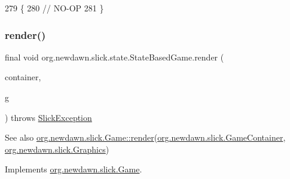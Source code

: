 \begin{DoxyCode}
279                                                                                             \{
280         \textcolor{comment}{// NO-OP}
281     \}
\end{DoxyCode}
\mbox{\label{classorg_1_1newdawn_1_1slick_1_1state_1_1_state_based_game_ae7832a5a852c1343e0abebf031bdc12a}} 
\subsubsection{\texorpdfstring{render()}{render()}}
{\footnotesize\ttfamily final void org.\+newdawn.\+slick.\+state.\+State\+Based\+Game.\+render (\begin{DoxyParamCaption}\item[{\mbox{\hyperlink{classorg_1_1newdawn_1_1slick_1_1_game_container}{Game\+Container}}}]{container,  }\item[{\mbox{\hyperlink{classorg_1_1newdawn_1_1slick_1_1_graphics}{Graphics}}}]{g }\end{DoxyParamCaption}) throws \mbox{\hyperlink{classorg_1_1newdawn_1_1slick_1_1_slick_exception}{Slick\+Exception}}\hspace{0.3cm}{\ttfamily [inline]}}

\begin{DoxySeeAlso}{See also}
\mbox{\hyperlink{interfaceorg_1_1newdawn_1_1slick_1_1_game_af1a4670d43eb3ba04dfcf55ab1975b64}{org.\+newdawn.\+slick.\+Game\+::render}}(\mbox{\hyperlink{classorg_1_1newdawn_1_1slick_1_1_game_container}{org.\+newdawn.\+slick.\+Game\+Container}}, \mbox{\hyperlink{classorg_1_1newdawn_1_1slick_1_1_graphics}{org.\+newdawn.\+slick.\+Graphics}}) 
\end{DoxySeeAlso}


Implements \mbox{\hyperlink{interfaceorg_1_1newdawn_1_1slick_1_1_game_af1a4670d43eb3ba04dfcf55ab1975b64}{org.\+newdawn.\+slick.\+Game}}.


